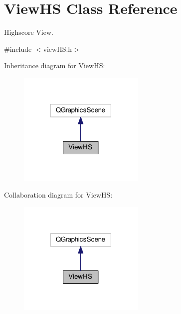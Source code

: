 \hypertarget{classViewHS}{\section{View\+H\+S Class Reference}
\label{classViewHS}
}


Highscore View.  




{\ttfamily \#include $<$view\+H\+S.\+h$>$}



Inheritance diagram for View\+H\+S\+:
\nopagebreak
\begin{figure}[H]
\begin{center}
\leavevmode
\includegraphics[width=171pt]{classViewHS__inherit__graph}
\end{center}
\end{figure}


Collaboration diagram for View\+H\+S\+:
\nopagebreak
\begin{figure}[H]
\begin{center}
\leavevmode
\includegraphics[width=171pt]{classViewHS__coll__graph}
\end{center}
\end{figure}
